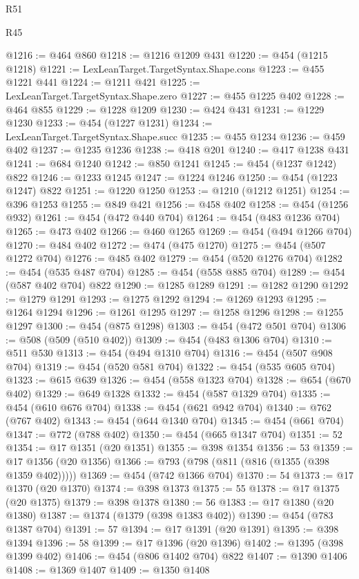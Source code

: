 \begin{lexlean}{R51}
\begin{lexlean}{R45}
\begin{coremodule}
{{{{{{{{{{{{{{{{{{{{{{{{{{{{{{{{{{{{{{{{{{{{{{{{{{{{{{{{{{{{{{{{{{{{{{{{{{{{{{{{{{{{{{{{{{{@1216 := @464 @860
@1218 := @1216 @1209 @431
@1220 := @454 (@1215 @1218)
@1221 := LexLeanTarget.TargetSyntax.Shape.cons
@1223 := @455 @1221 @441
@1224 := @1211 @421
@1225 := LexLeanTarget.TargetSyntax.Shape.zero
@1227 := @455 @1225 @402
@1228 := @464 @855
@1229 := @1228 @1209
@1230 := @424 @431
@1231 := @1229 @1230
@1233 := @454 (@1227 @1231)
@1234 := LexLeanTarget.TargetSyntax.Shape.succ
@1235 := @455 @1234
@1236 := @459 @402
@1237 := @1235 @1236
@1238 := @418 @201
@1240 := @417 @1238 @431
@1241 := @684 @1240
@1242 := @850 @1241
@1245 := @454 (@1237 @1242) @822
@1246 := @1233 @1245
@1247 := @1224 @1246
@1250 := @454 (@1223 @1247) @822
@1251 := @1220 @1250
@1253 := @1210 (@1212 @1251)
@1254 := @396 @1253
@1255 := @849 @421
@1256 := @458 @402
@1258 := @454 (@1256 @932)
@1261 := @454 (@472 @440 @704)
@1264 := @454 (@483 @1236 @704)
@1265 := @473 @402
@1266 := @460 @1265
@1269 := @454 (@494 @1266 @704)
@1270 := @484 @402
@1272 := @474 (@475 @1270)
@1275 := @454 (@507 @1272 @704)
@1276 := @485 @402
@1279 := @454 (@520 @1276 @704)
@1282 := @454 (@535 @487 @704)
@1285 := @454 (@558 @885 @704)
@1289 := @454 (@587 @402 @704) @822
@1290 := @1285 @1289
@1291 := @1282 @1290
@1292 := @1279 @1291
@1293 := @1275 @1292
@1294 := @1269 @1293
@1295 := @1264 @1294
@1296 := @1261 @1295
@1297 := @1258 @1296
@1298 := @1255 @1297
@1300 := @454 (@875 @1298)
@1303 := @454 (@472 @501 @704)
@1306 := @508 (@509 (@510 @402))
@1309 := @454 (@483 @1306 @704)
@1310 := @511 @530
@1313 := @454 (@494 @1310 @704)
@1316 := @454 (@507 @908 @704)
@1319 := @454 (@520 @581 @704)
@1322 := @454 (@535 @605 @704)
@1323 := @615 @639
@1326 := @454 (@558 @1323 @704)
@1328 := @654 (@670 @402)
@1329 := @649 @1328
@1332 := @454 (@587 @1329 @704)
@1335 := @454 (@610 @676 @704)
@1338 := @454 (@621 @942 @704)
@1340 := @762 (@767 @402)
@1343 := @454 (@644 @1340 @704)
@1345 := @454 (@661 @704)
@1347 := @772 (@788 @402)
@1350 := @454 (@665 @1347 @704)
@1351 := 52
@1354 := @17 @1351 (@20 @1351)
@1355 := @398 @1354
@1356 := 53
@1359 := @17 @1356 (@20 @1356)
@1366 := @793 (@798 (@811 (@816 (@1355 (@398 @1359 @402)))))
@1369 := @454 (@742 @1366 @704)
@1370 := 54
@1373 := @17 @1370 (@20 @1370)
@1374 := @398 @1373
@1375 := 55
@1378 := @17 @1375 (@20 @1375)
@1379 := @398 @1378
@1380 := 56
@1383 := @17 @1380 (@20 @1380)
@1387 := @1374 (@1379 (@398 @1383 @402))
@1390 := @454 (@783 @1387 @704)
@1391 := 57
@1394 := @17 @1391 (@20 @1391)
@1395 := @398 @1394
@1396 := 58
@1399 := @17 @1396 (@20 @1396)
@1402 := @1395 (@398 @1399 @402)
@1406 := @454 (@806 @1402 @704) @822
@1407 := @1390 @1406
@1408 := @1369 @1407
@1409 := @1350 @1408
}}}}}}}}}}}}}}}}}}}}}}}}}}}}}}}}}}}}}}}}}}}}}}}}}}}}}}}}}}}}}}}}}}}}}}}}}}}}}}}}}}}}}}}}}}}
\end{coremodule}
\end{lexlean}
\end{lexlean}
